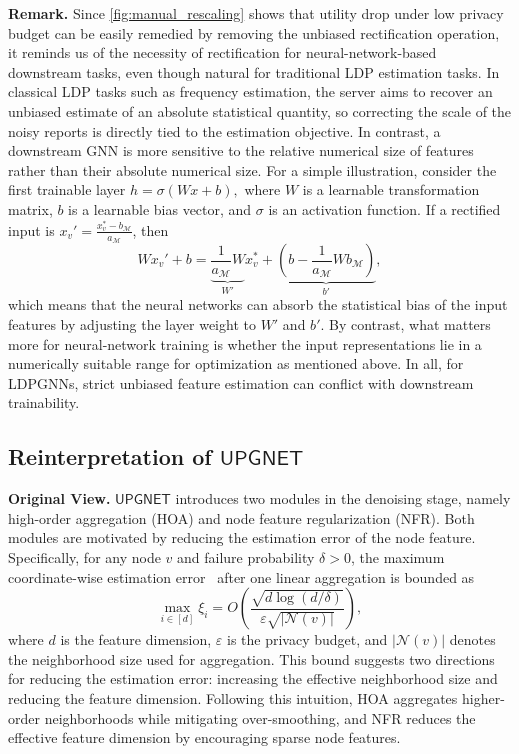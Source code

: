 \documentclass[conference,compsoc]{IEEEtran}
\theoremstyle{boldplain}
\theoremstyle{bolddefinition}
\theoremstyle{remark}
\newcommand{\mypara}[1]{\noindent\textbf{#1.}\xspace}
\newcommand{\hoa}{HOA\xspace}
\newcommand{\upgnet}{\ensuremath{\mathsf{UPGNET}}\xspace}
\newcommand{\nfr}{NFR\xspace}
\begin{document}
\vspace{0.1cm}

\mypara{Remark}
Since \autoref{fig:manual_rescaling} shows that utility drop under low privacy budget can be easily remedied by removing the unbiased rectification operation, it reminds us of the necessity of rectification for neural-network-based downstream tasks, even though natural for traditional LDP estimation tasks. 
In classical LDP tasks such as frequency estimation, the server aims to recover an unbiased estimate of an absolute statistical quantity, so correcting the scale of the noisy reports is directly tied to the estimation objective. 
In contrast, a downstream GNN is more sensitive to the relative numerical size of features rather than their absolute numerical size. 
For a simple illustration, consider the first trainable layer 
$h=\sigma(Wx+b),$
where $W$ is a learnable transformation matrix, $b$ is a learnable bias vector, and $\sigma$ is an activation function. 
If a rectified input is $x_v' = \frac{x_v^* - b_{\mathcal M}}{a_{\mathcal M}}$, then
\begin{equation}
W x_v' + b 
= 
\underbrace{\frac{1}{a_{\mathcal M}} W }_{\textstyle W'}x_v^*
+
\underbrace{\left(
b - \frac{1}{a_{\mathcal M}} W b_{\mathcal M}
\right)}_{\textstyle b'},
\end{equation}
which means that the neural networks can absorb the statistical bias of the input features by adjusting the layer weight to $W'$ and $b'$. 
By contrast, what matters more for neural-network training is whether the input representations lie in a numerically suitable range for optimization as mentioned above. 
In all, for LDPGNNs, strict unbiased feature estimation can conflict with downstream trainability.





\subsection{Reinterpretation of \upgnet}
\label{subsec:reinterpret_upgnet}

\mypara{Original View}
\upgnet introduces two modules in the denoising stage, namely high-order aggregation (\hoa) and node feature regularization (\nfr).
Both modules are motivated by reducing the estimation error of the node feature.
Specifically, for any node $v$ and failure probability $\delta>0$, the maximum coordinate-wise estimation error~\cite{upgnet-cite} after one linear aggregation is bounded as
\begin{equation}
    \max_{i\in[d]} \xi_i
    =
    O\left(
    \frac{\sqrt{d\log(d/\delta)}}{\varepsilon\sqrt{|\mathcal{N}(v)|}}
    \right),
    \label{eq:upgnet_error_bound}
\end{equation}
where $d$ is the feature dimension, $\varepsilon$ is the privacy budget, and $|\mathcal{N}(v)|$ denotes the neighborhood size used for aggregation.
This bound suggests two directions for reducing the estimation error: increasing the effective neighborhood size and reducing the feature dimension.
Following this intuition, \hoa aggregates higher-order neighborhoods while mitigating over-smoothing, and \nfr reduces the effective feature dimension by encouraging sparse node features.
\end{document}
